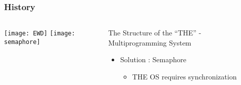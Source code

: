 \begin{frame}[plain]
	\frametitle{History}
	
	
	
	\begin{columns}
		
		\begin{column}{.4\textwidth}
			\centering
			\texttt{[image: EWD]}
			\texttt{[image: semaphore]}
			
			
			
		\end{column}
		
		\begin{column}{.6\textwidth}
			
			The Structure of the “THE” - Multiprogramming System
			\begin{itemize}
				\item Solution : Semaphore
				
				\begin{itemize}
					\item THE OS requires synchronization

				\end{itemize}
				
			\end{itemize}	
			
		\end{column}
		
		
	\end{columns}
	
	
\end{frame}


